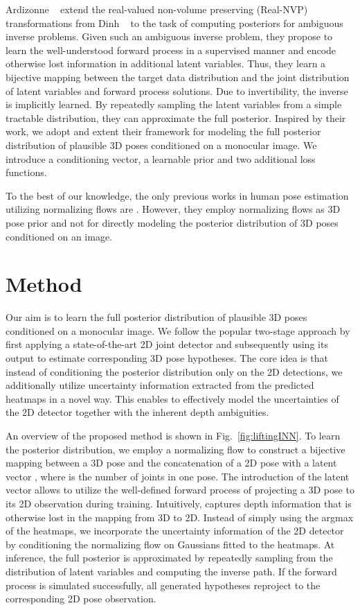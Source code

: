 \documentclass[10pt,twocolumn,letterpaper]{article}
\begin{document}
Ardizonne \etal~\cite{ArdizzoneINN} extend the real-valued non-volume preserving (Real-NVP) transformations from Dinh \etal~\cite{DBLP:conf/iclr/DinhSB17} to the task of computing posteriors for ambiguous inverse problems.
Given such an ambiguous inverse problem, they propose to learn the well-understood forward process in a supervised manner and encode otherwise lost information in additional latent variables.
Thus, they learn a bijective mapping between the target data distribution and the joint distribution of latent variables and forward process solutions.
Due to invertibility, the inverse is implicitly learned.
By repeatedly sampling the latent variables from a simple tractable distribution, they can approximate the full posterior. Inspired by their work, we adopt and extent their framework for modeling the full posterior distribution of plausible 3D poses conditioned on a monocular image.
We introduce a conditioning vector, a learnable prior and two additional loss functions.

To the best of our knowledge, the only previous works in human pose estimation utilizing normalizing flows are \cite{multi_bodies_biggs2020,xu2020ghum,Zanfir2020WeaklyS3}. However, they employ normalizing flows as 3D pose prior and not for directly modeling the posterior distribution of 3D poses conditioned on an image.

\section{Method}
Our aim is to learn the full posterior distribution of plausible 3D poses conditioned on a monocular image. We follow the popular two-stage approach by first applying a state-of-the-art 2D joint detector \cite{Sun_2019_CVPR} and subsequently using its output to estimate corresponding 3D pose hypotheses. The core idea is that instead of conditioning the posterior distribution only on the 2D detections, we additionally utilize uncertainty information extracted from the predicted heatmaps in a novel way. This enables to effectively model the uncertainties of the 2D detector together with the inherent depth ambiguities.

An overview of the proposed method is shown in Fig.~\ref{fig:liftingINN}.
To learn the posterior distribution, we employ a normalizing flow to construct a bijective mapping between a 3D pose  and the concatenation of a 2D pose  with a latent vector , where  is the number of joints in one pose.
The introduction of the latent vector  allows to utilize the well-defined forward process of projecting a 3D pose to its 2D observation during training.
Intuitively,  captures depth information that is otherwise lost in the mapping from 3D to 2D.
Instead of simply using the argmax of the heatmaps, we incorporate the uncertainty information of the 2D detector by conditioning the normalizing flow on Gaussians fitted to the heatmaps.
At inference, the full posterior is approximated by repeatedly sampling  from the distribution of latent variables and computing the inverse path.
If the forward process is simulated successfully, all generated hypotheses reproject to the corresponding 2D pose observation.
\end{document}
